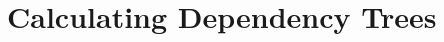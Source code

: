\section{Calculating Dependency Trees}

\begin{listing}[H]
\begin{verbatim}

\end{verbatim}
\end{listing}
